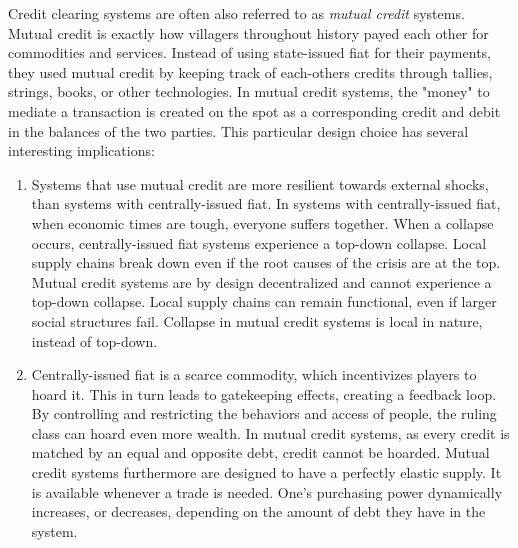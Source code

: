 \documentclass{article}
\begin{document}
Credit clearing systems are often also referred to as \textit{mutual credit} systems. Mutual credit is exactly how villagers throughout history payed each other for commodities and services. Instead of using state-issued fiat for their payments, they used mutual credit by keeping track of each-others credits through tallies, strings, books, or other technologies. In mutual credit systems, the "money" to mediate a transaction is created on the spot as a corresponding credit and debit in the balances of the two parties. This particular design choice has several interesting implications:
\begin{enumerate}
    \item Systems that use mutual credit are more resilient towards external shocks, than systems with centrally-issued fiat. In systems with centrally-issued fiat, when economic times are tough, everyone suffers together. When a collapse occurs, centrally-issued fiat systems experience a top-down collapse. Local supply chains break down even if the root causes of the crisis are at the top. Mutual credit systems are by design decentralized and cannot experience a top-down collapse. Local supply chains can remain functional, even if larger social structures fail. Collapse in mutual credit systems is local in nature, instead of top-down.
    \item Centrally-issued fiat is a scarce commodity, which incentivizes players to hoard it. This in turn leads to gatekeeping effects, creating a feedback loop. By controlling and restricting the behaviors and access of people, the ruling class can hoard even more wealth.
    In mutual credit systems, as every credit is matched by an equal and opposite debt, credit cannot be hoarded. Mutual credit systems furthermore are designed to have a perfectly elastic supply. It is available whenever a trade is needed. One's purchasing power dynamically increases, or decreases, depending on the amount of debt they have in the system.

\end{enumerate}
\end{document}
